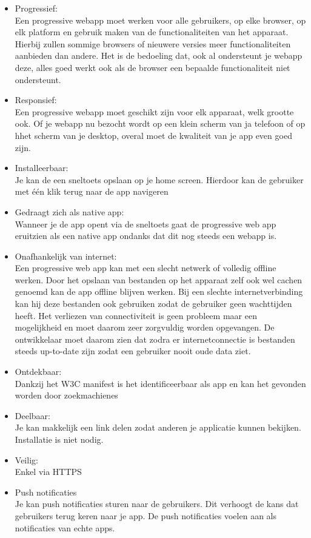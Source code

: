 \begin{itemize}  
	\item Progressief: \\
	Een progressive webapp moet werken voor alle gebruikers, op elke browser, op elk platform en gebruik maken van de functionaliteiten van het apparaat. Hierbij zullen sommige browsers of nieuwere versies meer functionaliteiten aanbieden dan andere. Het is de bedoeling dat, ook al ondersteunt je webapp deze, alles goed werkt ook als de browser een bepaalde functionaliteit niet ondersteunt. \\ 
	\item Responsief: \\
	Een progressive webapp moet geschikt zijn voor elk apparaat, welk grootte ook. Of je webapp nu bezocht wordt op een klein scherm van ja telefoon of op hhet scherm van je desktop, overal moet de kwaliteit van je app even goed zijn. 
	\\
	\item Installeerbaar: \\
	Je kan de een sneltoets opslaan op je home screen. Hierdoor kan de gebruiker met één klik terug naar de app navigeren
	\\
	\item Gedraagt zich als native app: \\
	Wanneer je de app opent via de sneltoets gaat de progressive web app eruitzien als een native app ondanks dat dit nog steeds een webapp is.
	\\
	\item Onafhankelijk van internet: \\
	Een progressive web app kan met een slecht netwerk of volledig offline werken. Door het opslaan van bestanden op het apparaat zelf ook wel cachen genoemd kan de app offline blijven werken. Bij een slechte internetverbinding kan hij deze bestanden ook gebruiken zodat de gebruiker geen wachttijden heeft. Het verliezen van connectiviteit is geen probleem maar een mogelijkheid en moet daarom zeer zorgvuldig worden opgevangen. De ontwikkelaar moet daarom zien dat zodra er internetconnectie is bestanden steeds up-to-date zijn zodat een gebruiker nooit oude data ziet.
	\\
		\item Ontdekbaar: \\
	Dankzij het W3C manifest is het identificeerbaar als app en kan het gevonden worden door zoekmachienes
	\\
		\item Deelbaar: \\
	Je kan makkelijk een link delen zodat anderen je applicatie kunnen bekijken. Installatie is niet nodig.
	\\
		\item Veilig: \\
	Enkel via HTTPS
	\\
		\item Push notificaties \\
	Je kan push notificaties sturen naar de gebruikers. Dit verhoogt de kans dat gebruikers terug keren naar je app. De push notificaties voelen aan als notificaties van echte apps.
	\\
\end{itemize}

